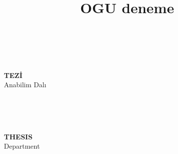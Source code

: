 \documentclass[]{esogu}			%
\begin{document}
\frontmatter %
\title{OGU deneme}
\begin{titlingpage*}
\begin{center}
\footnotesize

\vspace{9cm}								%
	\begin{vplace}							%
	\large									%
	\tbaslik\\								%
	\footnotesize							%

	\vspace{1pc}
	\yazar	\\								%
	\vspace{1pc}
	\textbf{\unvan\space TEZİ}\\
  	\vspace{1pc}
	\bolum \space Anabilim Dalı\\
	\vspace{1pc}
	\teslim\\
	\end{vplace}
\end{center}

\end{titlingpage*}
\begin{titlingpage*}
\begin{center}
\footnotesize


	\begin{vplace}							%
	\large									%
	\tbasliken\\								%
	\footnotesize							%

	\vspace{1pc}
	\yazar	\\								%
	\vspace{1pc}
	\textbf{\unvanen\space THESIS}\\
  	\vspace{1pc}
	\bolumen \space Department\\
	\vspace{1pc}
	\teslimen\\
	\end{vplace}
\end{center}

\end{titlingpage*}
\end{document}
